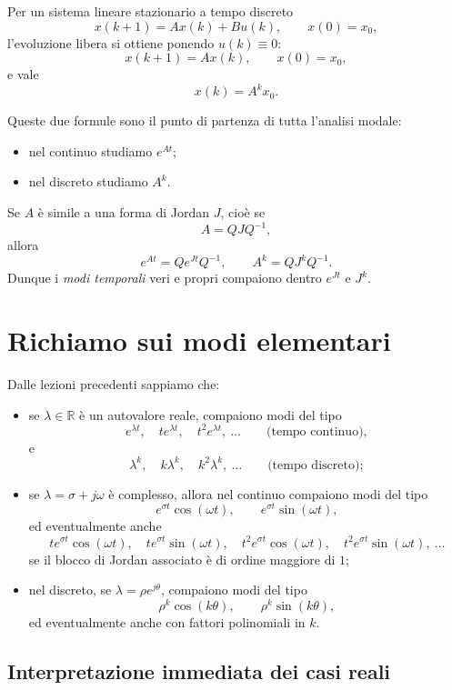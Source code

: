 Per un sistema lineare stazionario a tempo discreto
\[
x(k+1)=Ax(k)+Bu(k), \qquad x(0)=x_0,
\]
l'evoluzione libera si ottiene ponendo $u(k)\equiv 0$:
\[
x(k+1)=Ax(k), \qquad x(0)=x_0,
\]
e vale
\begin{equation}
x(k)=A^k x_0.
\label{eq:L10_free_DT}
\end{equation}

Queste due formule sono il punto di partenza di tutta l'analisi modale:
\begin{itemize}
    \item nel continuo studiamo $e^{At}$;
    \item nel discreto studiamo $A^k$.
\end{itemize}

Se $A$ è simile a una forma di Jordan $J$, cioè se
\[
A=QJQ^{-1},
\]
allora
\[
e^{At}=Qe^{Jt}Q^{-1},
\qquad
A^k=QJ^kQ^{-1}.
\]
Dunque i \emph{modi temporali} veri e propri compaiono dentro $e^{Jt}$ e $J^k$.

\section{Richiamo sui modi elementari}

Dalle lezioni precedenti sappiamo che:

\begin{itemize}
    \item se $\lambda\in\mathbb{R}$ è un autovalore reale, compaiono modi del tipo
    \[
    e^{\lambda t},\quad te^{\lambda t},\quad t^2 e^{\lambda t},\ \dots
    \qquad \text{(tempo continuo)},
    \]
    e
    \[
    \lambda^k,\quad k\lambda^k,\quad k^2\lambda^k,\ \dots
    \qquad \text{(tempo discreto)};
    \]
    \item se $\lambda=\sigma+j\omega$ è complesso, allora nel continuo compaiono modi del tipo
    \[
    e^{\sigma t}\cos(\omega t), \qquad e^{\sigma t}\sin(\omega t),
    \]
    ed eventualmente anche
    \[
    t e^{\sigma t}\cos(\omega t),\quad
    t e^{\sigma t}\sin(\omega t),\quad
    t^2 e^{\sigma t}\cos(\omega t),\quad
    t^2 e^{\sigma t}\sin(\omega t),\ \dots
    \]
    se il blocco di Jordan associato è di ordine maggiore di $1$;
    \item nel discreto, se $\lambda=\rho e^{j\theta}$, compaiono modi del tipo
    \[
    \rho^k\cos(k\theta),\qquad \rho^k\sin(k\theta),
    \]
    ed eventualmente anche con fattori polinomiali in $k$.
\end{itemize}

\subsection{Interpretazione immediata dei casi reali}

